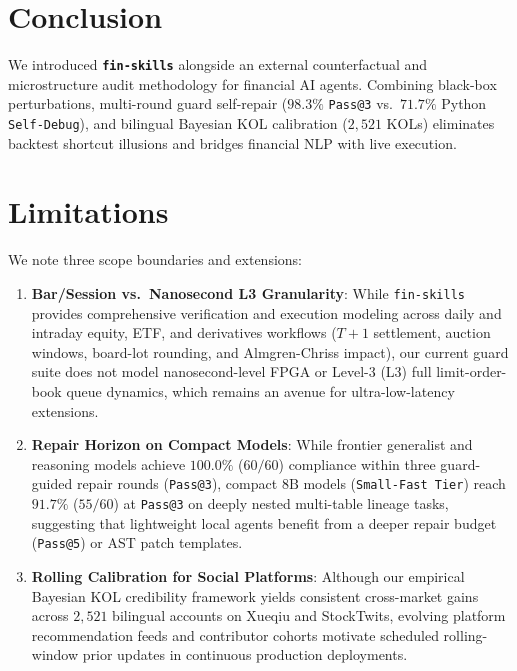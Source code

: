 \section{Conclusion}
\label{sec:conclusion}
\vspace{-0.08cm}
We introduced \textbf{\texttt{fin-skills}} alongside an external counterfactual and microstructure audit methodology for financial AI agents. Combining black-box perturbations, multi-round guard self-repair ($98.3\%$ \texttt{Pass@3} vs.\ $71.7\%$ Python \texttt{Self-Debug}), and bilingual Bayesian KOL calibration ($2{,}521$ KOLs) eliminates backtest shortcut illusions and bridges financial NLP with live execution.

\clearpage

\section*{Limitations}
\label{sec:limitations}
\vspace{-0.14cm}
We note three scope boundaries and extensions:
\begin{enumerate}\setlength{\itemsep}{0.5pt}\setlength{\parskip}{0pt}\setlength{\topsep}{1.5pt}
    \item \textbf{Bar/Session vs.\ Nanosecond L3 Granularity}: While \texttt{fin-skills} provides comprehensive verification and execution modeling across daily and intraday equity, ETF, and derivatives workflows ($T+1$ settlement, auction windows, board-lot rounding, and Almgren-Chriss impact), our current guard suite does not model nanosecond-level FPGA or Level-3 (L3) full limit-order-book queue dynamics, which remains an avenue for ultra-low-latency extensions.
    \item \textbf{Repair Horizon on Compact Models}: While frontier generalist and reasoning models achieve $100.0\%$ ($60/60$) compliance within three guard-guided repair rounds (\texttt{Pass@3}), compact $8\text{B}$ models (\texttt{Small-Fast Tier}) reach $91.7\%$ ($55/60$) at \texttt{Pass@3} on deeply nested multi-table lineage tasks, suggesting that lightweight local agents benefit from a deeper repair budget (\texttt{Pass@5}) or AST patch templates.
    \item \textbf{Rolling Calibration for Social Platforms}: Although our empirical Bayesian KOL credibility framework yields consistent cross-market gains across $2{,}521$ bilingual accounts on Xueqiu and StockTwits, evolving platform recommendation feeds and contributor cohorts motivate scheduled rolling-window prior updates in continuous production deployments.
\end{enumerate}
\vspace{-0.22cm}
